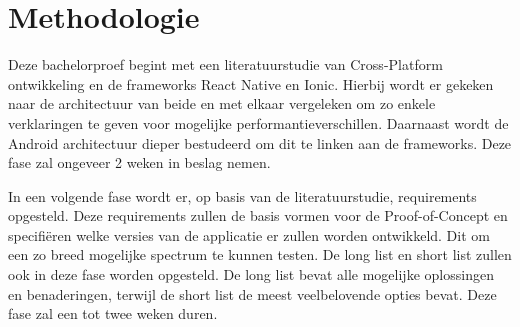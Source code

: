 




\section{Methodologie}%
\label{sec:methodologie}

Deze bachelorproef begint met een literatuurstudie van Cross-Platform ontwikkeling en de frameworks React Native en Ionic. Hierbij wordt er gekeken naar de architectuur van beide en met elkaar vergeleken om zo enkele verklaringen te geven voor mogelijke performantieverschillen. Daarnaast wordt de Android architectuur dieper bestudeerd om dit te linken aan de frameworks. Deze fase zal ongeveer 2 weken in beslag nemen.

In een volgende fase wordt er, op basis van de literatuurstudie, requirements opgesteld. Deze requirements zullen de basis vormen voor de Proof-of-Concept en specifiëren welke versies van de applicatie er zullen worden ontwikkeld. Dit om een zo breed mogelijke spectrum te kunnen testen. De long list en short list zullen ook in deze fase worden opgesteld. De long list bevat alle mogelijke oplossingen en benaderingen, terwijl de short list de meest veelbelovende opties bevat. Deze fase zal een tot twee weken duren.

